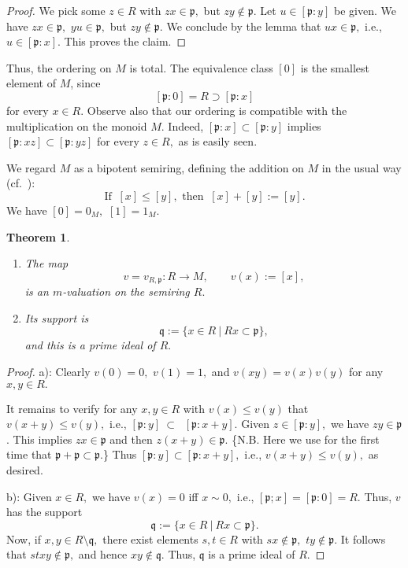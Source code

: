 \documentclass [12pt,a4paper,reqno]{amsart}
\newtheorem{thm}{Theorem} [section]
\begin{document}
\begin{proof}
We pick some $z\in R$ with $zx\in {\mathfrak p} ,$ but $zy\notin {\mathfrak p}.$ Let
$u\in[{\mathfrak p} :y]$ be given. We have $zx\in {\mathfrak p} ,$ $yu\in {\mathfrak p} ,$
but $zy\notin {\mathfrak p} .$ We conclude by the lemma that $ux\in {\mathfrak p} ,$
i.e., $u\in [{\mathfrak p} :x].$ This proves the claim.\end{proof}

Thus, the ordering on $M$ is total. The equivalence class $[0]$ is
the smallest element of $M$, since
$$[{\mathfrak p} :0]=R\supset[{\mathfrak p} :x]$$
for every $x\in R.$ Observe also that our ordering is compatible
with the multiplication on the monoid $M.$ Indeed,
$[{\mathfrak p}:x]\subset[{\mathfrak p} :y]$ implies $[{\mathfrak p} :xz]\subset[{\mathfrak p} :yz]$
for every $z\in R,$ as is easily seen.

We regard $M$ as a bipotent semiring, defining the addition on $M$
in the usual way (cf.~\cite[\S1]{IKR1}): $$ \text{If } \ [x]\le
[y], \text{ then } \ [x]+[y] :=[y].$$ We have $[0]=0_M,$
$[1]=1_M.$

\begin{thm}\label{thm1.6}
{}\quad

\begin{enumerate}
\item[a)] The map
$$v=v_{R,{\mathfrak p}
}: R\to M,\qquad v(x):=[x],$$ is an $m$-valuation on the semiring
$R.$

\item[b)] Its support is
$${\mathfrak q}  :=\{x\in R {\ {|} \ }Rx\subset {\mathfrak p} \},$$
and this is a prime ideal of $R.$\end{enumerate}
\end{thm}

\begin{proof}
a): Clearly $v(0)=0,$ $v(1)=1,$ and $v(xy)=v(x)v(y)$ for any
$x,y\in R.$

It remains to verify for any $x,y\in R$  with $v(x) \leq v(y)$
that $v(x+y)\le v(y),$ i.e., $[{\mathfrak p} :y]{\ {\subset} \ } $ $[{\mathfrak p}
:x+y].$ Given $z\in [{\mathfrak p} :y],$ we have $zy\in {\mathfrak p} $. This
implies $zx\in {\mathfrak p}$ and then $z(x+y)\in {\mathfrak p}.$ \{N.B. Here we use
for the first time that ${\mathfrak p} + {\mathfrak p} \subset {\mathfrak p} .$\} Thus $[{\mathfrak p}
:y]\subset [{\mathfrak p} :x+y],$ i.e., $v(x+y)\le v(y),$ as desired.
{\vskip 1.5mm \noindent}

 b): Given $x\in R,$ we have $v(x)=0$ iff $x\sim
0,$ i.e., $[{\mathfrak p} ;x]=[{\mathfrak p} :0]=R.$ Thus, $v$ has the support
$${\mathfrak q} :=\{x\in R {\ {|} \ }Rx\subset {\mathfrak p} \}.$$  Now, if $x,y\in
R\setminus{\mathfrak q} ,$ there exist elements $s,t\in R$ with $sx\notin
{\mathfrak p} ,$ $ty\notin {\mathfrak p} .$ It follows that $stxy\notin {\mathfrak p} ,$ and
hence $xy\notin{\mathfrak q} .$ Thus, ${\mathfrak q}  $ is a prime ideal of $R.$
\end{proof}
\end{document}
